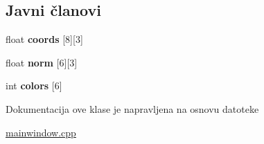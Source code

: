 \subsection*{Javni članovi}
\begin{DoxyCompactItemize}
\item 
float {\bfseries coords} \mbox{[}8\mbox{]}\mbox{[}3\mbox{]}\hypertarget{classCube_a5c9e4ff86b1c84ac750c61a456aeb72a}{}\label{classCube_a5c9e4ff86b1c84ac750c61a456aeb72a}

\item 
float {\bfseries norm} \mbox{[}6\mbox{]}\mbox{[}3\mbox{]}\hypertarget{classCube_a2baa7d4ba384ffbb1fac401f4faaa2d1}{}\label{classCube_a2baa7d4ba384ffbb1fac401f4faaa2d1}

\item 
int {\bfseries colors} \mbox{[}6\mbox{]}\hypertarget{classCube_a33a049beb8b3476041f43f9953d2060b}{}\label{classCube_a33a049beb8b3476041f43f9953d2060b}

\end{DoxyCompactItemize}


Dokumentacija ove klase je napravljena na osnovu datoteke \begin{DoxyCompactItemize}
\item 
\hyperlink{mainwindow_8cpp}{mainwindow.\+cpp}\end{DoxyCompactItemize}
